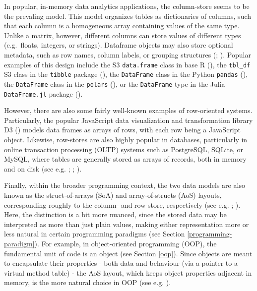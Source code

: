 \documentclass[
  openany]{book}
\theoremstyle{definition}
\theoremstyle{definition}
\theoremstyle{definition}
\theoremstyle{definition}
\theoremstyle{remark}
\begin{document}
In popular, in-memory data analytics applications, the column-store seems to be the prevaling model. This model organizes tables as dictionaries of columns, such that each column is a homogeneous array containing values of the same type. Unlike a matrix, however, different columns can store values of different types (e.g.~floats, integers, or strings). Dataframe objects may also store optional metadata, such as row names, column labels, or grouping structures (; ). Popular examples of this design include the S3 \texttt{data.frame} class in base R (), the \texttt{tbl\_df} S3 class in the \texttt{tibble} package (), the \texttt{DataFrame} class in the Python \texttt{pandas} (), the \texttt{DataFrame} class in the \texttt{polars} (), or the \texttt{DataFrame} type in the Julia \texttt{DataFrame.jl} package ().

However, there are also some fairly well-known examples of row-oriented systems. Particularly, the popular JavaScript data visualization and transformation library D3 () models data frames as arrays of rows, with each row being a JavaScript object. Likewise, row-stores are also highly popular in databases, particularly in online transaction processing (OLTP) systems such as PostgreSQL, SQLite, or MySQL, where tables are generally stored as arrays of records, both in memory and on disk (see e.g. ; ; ).

Finally, within the broader programming context, the two data models are also known as the struct-of-arrays (SoA) and array-of-structs (AoS) layouts, corresponding roughly to the column- and row-store, respectively (see e.g. ; ). Here, the distinction is a bit more nuanced, since the stored data may be interpreted as more than just plain values, making either representation more or less natural in certain programming paradigms (see Section \ref{programming-paradigm}). For example, in object-oriented programming (OOP), the fundamental unit of code is an object (see Section \ref{oop}). Since objects are meant to encapsulate their properties - both data and behaviour (via a pointer to a virtual method table) - the AoS layout, which keeps object properties adjacent in memory, is the more natural choice in OOP (see e.g. ).
\end{document}
